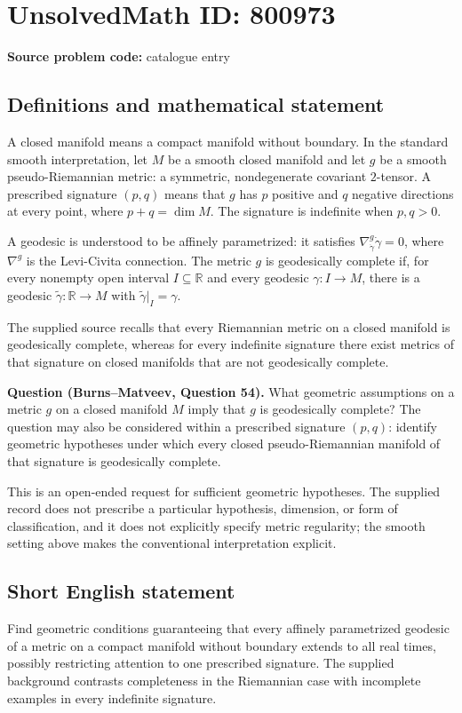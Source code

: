 \documentclass[11pt]{article}
\newcommand{\R}{\mathbb{R}}
\begin{document}
\section*{UnsolvedMath ID: 800973}
\textbf{Source problem code:} catalogue entry
\subsection{Definitions and mathematical statement}
A closed manifold means a compact manifold without boundary. In the standard smooth interpretation, let \(M\) be a smooth closed manifold and let \(g\) be a smooth pseudo-Riemannian metric: a symmetric, nondegenerate covariant \(2\)-tensor. A prescribed signature \((p,q)\) means that \(g\) has \(p\) positive and \(q\) negative directions at every point, where \(p+q=\dim M\). The signature is indefinite when \(p,q>0\).

A geodesic is understood to be affinely parametrized: it satisfies \(\nabla^g_{\dot\gamma}\dot\gamma=0\), where \(\nabla^g\) is the Levi-Civita connection. The metric \(g\) is geodesically complete if, for every nonempty open interval \(I\subseteq\R\) and every geodesic \(\gamma:I\to M\), there is a geodesic \(\widetilde\gamma:\R\to M\) with \(\widetilde\gamma|_I=\gamma\).

The supplied source recalls that every Riemannian metric on a closed manifold is geodesically complete, whereas for every indefinite signature there exist metrics of that signature on closed manifolds that are not geodesically complete.

\textbf{Question (Burns--Matveev, Question 54).} What geometric assumptions on a metric \(g\) on a closed manifold \(M\) imply that \(g\) is geodesically complete? The question may also be considered within a prescribed signature \((p,q)\): identify geometric hypotheses under which every closed pseudo-Riemannian manifold of that signature is geodesically complete.

This is an open-ended request for sufficient geometric hypotheses. The supplied record does not prescribe a particular hypothesis, dimension, or form of classification, and it does not explicitly specify metric regularity; the smooth setting above makes the conventional interpretation explicit.
\subsection{Short English statement}
Find geometric conditions guaranteeing that every affinely parametrized geodesic of a metric on a compact manifold without boundary extends to all real times, possibly restricting attention to one prescribed signature. The supplied background contrasts completeness in the Riemannian case with incomplete examples in every indefinite signature.
\end{document}
